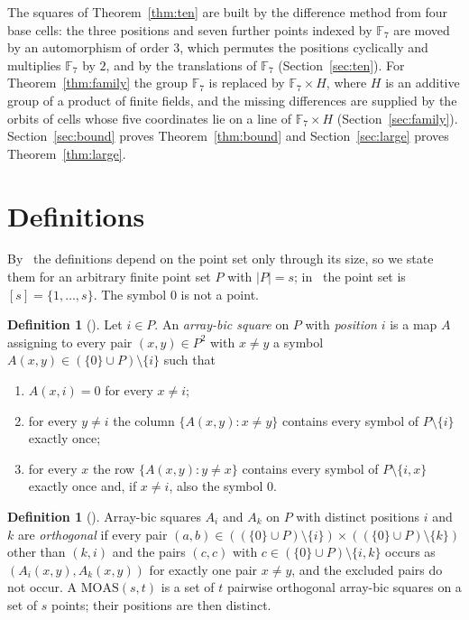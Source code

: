 \documentclass[11pt]{amsart}
\theoremstyle{definition}\newtheorem{definition}[theorem]{Definition}
\theoremstyle{remark}\newtheorem{remark}[theorem]{Remark}
\newcommand{\MOAS}{\mathrm{MOAS}}
\begin{document}
The squares of Theorem~\ref{thm:ten} are built by the difference method from four base cells: the three positions
and seven further points indexed by $\mathbb F_7$ are moved by an automorphism of order $3$, which permutes the
positions cyclically and multiplies $\mathbb F_7$ by $2$, and by the translations of $\mathbb F_7$
(Section~\ref{sec:ten}). For Theorem~\ref{thm:family} the group $\mathbb F_7$ is replaced by $\mathbb F_7\times H$,
where $H$ is an additive group of a product of finite fields, and the missing differences are supplied by the orbits of
cells whose five coordinates lie on a line of $\mathbb F_7\times H$ (Section~\ref{sec:family}).
Section~\ref{sec:bound} proves Theorem~\ref{thm:bound} and Section~\ref{sec:large} proves Theorem~\ref{thm:large}.

\section{Definitions}\label{sec:def}
By~\cite[Lemma~2.19]{ABW} the definitions depend on the point set only through its size, so we state them for an
arbitrary finite point set $P$ with $|P|=s$; in~\cite{ABW} the point set is $[s]=\{1,\dots,s\}$. The symbol $0$ is
not a point.

\begin{definition}[{\cite[Definition~2.16]{ABW}}]\label{def:abs}
Let $i\in P$. An \emph{array-bic square} on $P$ with \emph{position} $i$ is a map $A$ assigning to every pair
$(x,y)\in P^2$ with $x\ne y$ a symbol $A(x,y)\in(\{0\}\cup P)\setminus\{i\}$ such that
\begin{enumerate}
\item[(i)] $A(x,i)=0$ for every $x\ne i$;
\item[(ii)] for every $y\ne i$ the column $\{A(x,y):x\ne y\}$ contains every symbol of $P\setminus\{i\}$ exactly once;
\item[(iii)] for every $x$ the row $\{A(x,y):y\ne x\}$ contains every symbol of $P\setminus\{i,x\}$ exactly once and,
if $x\ne i$, also the symbol $0$.
\end{enumerate}
\end{definition}

\begin{definition}[{\cite[Definition~2.17]{ABW}}]\label{def:orth}
Array-bic squares $A_i$ and $A_k$ on $P$ with distinct positions $i$ and $k$ are \emph{orthogonal} if every pair
$(a,b)\in((\{0\}\cup P)\setminus\{i\})\times((\{0\}\cup P)\setminus\{k\})$ other than $(k,i)$ and the pairs $(c,c)$
with $c\in(\{0\}\cup P)\setminus\{i,k\}$ occurs as $(A_i(x,y),A_k(x,y))$ for exactly one pair $x\ne y$, and the
excluded pairs do not occur. A $\MOAS(s,t)$ is a set of $t$ pairwise orthogonal array-bic squares on a set of $s$
points; their positions are then distinct.
\end{definition}
\end{document}
